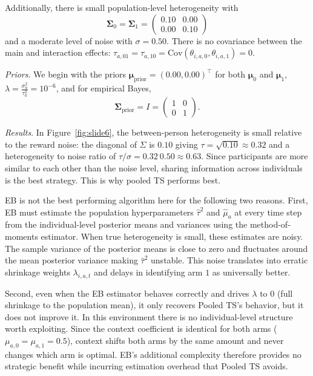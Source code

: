 \documentclass[letterpaper, 9pt]{extarticle}
\begin{document}
Additionally, there is small population-level heterogeneity with $$\boldsymbol{\Sigma}_0 = \boldsymbol{\Sigma}_1 = \begin{pmatrix} 0.10 & 0.00 \\ 0.00 & 0.10 \end{pmatrix}$$ and a moderate level of noise with $\sigma = 0.50$. There is no covariance between the main and interaction effects: $\tau_{a,01}=\tau_{a,10}= \text{Cov}(\theta_{i,a,0}, \theta_{i,a,1})=0$.

\textit{Priors}. We begin with the priors $\boldsymbol{\mu}_{\mathrm{prior}} = (0.00, 0.00)^\top$ for both $\boldsymbol{\mu}_0$ and $\boldsymbol{\mu}_1$,\ $\lambda = \frac{\sigma_a^2}{\tau_0^2}=10^{-6}$, and for empirical Bayes, $$\boldsymbol{\Sigma}_{\mathrm{prior}} = I=\begin{pmatrix} 1 & 0 \\ 0 & 1 \end{pmatrix}.$$

\textit{Results}. In Figure~\ref{fig:slide6}, the between-person heterogeneity is small relative to the reward noise: the diagonal of $\Sigma$ is $0.10$ giving $\tau = \sqrt{0.10} \approx 0.32$ and a heterogeneity to noise ratio of $\tau / \sigma = 0.32 \ 0.50 \approx 0.63$. Since participants are more similar to each other than the noise level, sharing information across individuals is the best strategy. This is why pooled TS performs best. 

EB is not the best performing algorithm here for the following two reasons. First, EB must estimate the population hyperparameters $\hat{\tau}^2$ and $\hat{\mu}_a$ at every time step from the individual-level posterior means and variances using the method-of-moments estimator. When true heterogeneity is small, these estimates are noisy. The sample variance of the posterior means is close to zero and fluctuates around the mean posterior variance making $\hat{\tau}^2$ unstable. This noise translates into erratic shrinkage weights $\lambda_{i,a,t}$ and delays in identifying arm $1$ as universally better. 

Second, even when the EB estimator behaves correctly and drives $\lambda$ to $0$ (full shrinkage to the population mean), it only recovers Pooled TS's behavior, but it does not improve it. In this environment there is no individual-level structure worth exploiting. Since the context coefficient is identical for both arms ($\mu_{a,0} = \mu_{a,1} = 0.5$), context shifts both arms by the same amount and never changes which arm is optimal. EB's additional complexity  therefore provides no strategic benefit while incurring estimation overhead that Pooled TS avoids.
\end{document}
